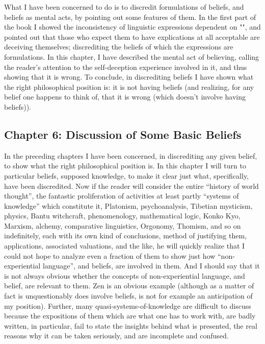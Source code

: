 What I have been concerned to do is to discredit formulations of 
beliefs, and beliefs as mental acts, by pointing out some features of them. In 
the first part of the book I showed the inconsistency of linguistic expressions 
dependent on "", and pointed out that those who expect them 
to have explications at all acceptable are deceiving themselves; discrediting 
the beliefs of which the expressions are formulations. In this chapter, I have 
described the mental act of believing, calling the reader's attention to the 
self-deception experience involved in it, and thus showing that it is wrong. 
To conclude, in discrediting beliefs I have shown what the right 
philosophical position is: it is not having beliefs (and realizing, for any belief 
one happens to think of, that it is wrong (which doesn't involve having beliefs)). 


\subsection[Chapter 6: Discussion of Some Basic Beliefs][Discussion of Some Basic Beliefs]{Chapter 6: Discussion of Some Basic Beliefs}

In the preceding chapters I have been concerned, in discrediting any 
given belief, to show what the right philosophical position is. In this chapter 
I will turn to particular beliefs, supposed knowledge, to make it clear just 
what, specifically, have been discredited. Now if the reader will consider the 
entire \enquote{history of world thought}, the fantastic proliferation of activities at 
least partly \enquote{systems of knowledge} which constitute it, Platonism, 
psychoanalysis, Tibetian mysticism, physics, Bantu witchcraft, 
phenomenology, mathematical logic, Konko Kyo, Marxism, alchemy, 
comparative linguistics, Orgonomy, Thomism, and so on indefinitely, each 
with its own kind of conclusions, method of justifying them, applications, 
associated valuations, and the like, he will quickly realize that I could not 
hope to analyze even a fraction of them to show just how \enquote{non-experiential 
language}, and beliefs, are involved in them. And I should say that it is not 
always obvious whether the concepts of non-experiential language, and 
belief, are relevant to them. Zen is an obvious example (although as a matter 
of fact is unquestionably does involve beliefs, is not for example an 
anticipation of my position). Further, many quasi-systems-of-knowledge are 
difficult to discuss because the expositions of them which are what one has 
to work with, are badly written, in particular, fail to state the insights behind 
what is presented, the real reasons why it can be taken seriously, and are 
incomplete and confused. 

